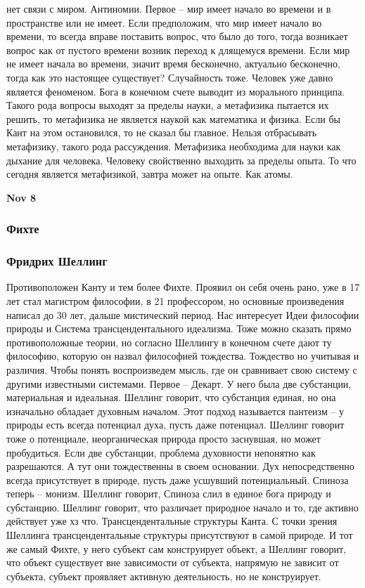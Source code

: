 \documentclass[a4paper, 12pt]{article}
\begin{document}
нет связи с миром. Антиномии. Первое -- мир имеет начало во времени 
и в пространстве или не имеет. Если предположим, что мир имеет начало во 
времени, то всегда вправе поставить вопрос, что было до того, тогда 
возникает вопрос как от пустого времени возник переход к длящемуся 
времени. Если мир не имеет начала во времени, значит время бесконечно, 
актуально бесконечно, тогда как это настоящее существует? Случайность 
тоже. Человек уже давно является феноменом. Бога в конечном счете 
выводит из морального принципа. Такого рода вопросы выходят за пределы 
науки, а метафизика пытается их решить, то метафизика не является наукой 
как математика и физика. Если бы Кант на этом остановился, то не сказал 
бы главное. Нельзя отбрасывать метафизику, такого рода рассуждения. 
Метафизика необходима для науки как дыхание для человека. Человеку 
свойственно выходить за пределы опыта. То что сегодня является 
метафизикой, завтра может на опыте. Как атомы.

\hfill\textbf{Nov 8}

\subsubsection{Фихте}

\subsubsection{Фридрих Шеллинг}

Противоположен Канту и тем более Фихте. Проявил он себя очень рано, уже 
в 17 лет стал магистром философии, в 21 профессором, но основные 
произведения написал до 30 лет, дальше мистический период. Нас 
интересует Идеи философии природы и Система трансцендентального 
идеализма. Тоже можно сказать прямо противоположные теории, но согласно 
Шеллингу в конечном счете дают ту философию, которую он назвал 
философией тождества. Тождество но учитывая и различия. Чтобы понять 
воспроизведем мысль, где он сравнивает свою систему с другими известными 
системами. Первое -- Декарт. У него была две субстанции, материальная 
и идеальная. Шеллинг говорит, что субстанция единая, но она изначально 
обладает духовным началом. Этот подход называется пантеизм -- у природы 
есть всегда потенциал духа, пусть даже потенциал. Шеллинг говорит тоже 
о потенциале, неорганическая природа просто заснувшая, но может 
пробудиться. Если две субстанции, проблема духовности непонятно как 
разрешаются. А тут они тождественны в своем основании. Дух 
непосредственно всегда присутствует в природе, пусть даже усшувший 
потенциальный. Спиноза теперь -- монизм. Шеллинг говорит, Спиноза слил 
в единое бога природу и субстанцию. Шеллинг говорит, что различает 
природное начало и то, где активно действует уже хз что. 
Трансцендентальные структуры Канта. С точки зрения Шеллинга 
трансцендентальные структуры присутствуют в самой природе. И тот же 
самый Фихте, у него субъект сам конструирует объект, а Шеллинг говорит, 
что объект существует вне зависимости от субъекта, напрямую не зависит 
от субъекта, субъект проявляет активную деятельность, но не 
конструирует.
\end{document}
